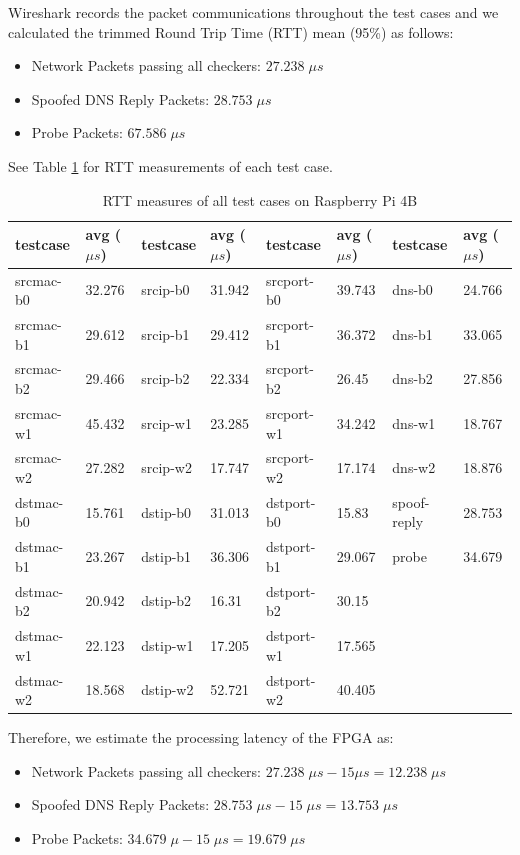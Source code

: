 \documentclass[a4paper]{report}
\begin{document}
Wireshark records the packet communications throughout the test cases and we calculated the trimmed Round Trip Time (RTT) mean (95\%) as follows:
\begin{itemize}[noitemsep]
    \item Network Packets passing all checkers: $27.238\; \mu s$
    \item Spoofed DNS Reply Packets: $28.753\; \mu s$
    \item Probe Packets: $67.586\; \mu s$
\end{itemize}
See Table \ref{table:performance-test} for RTT measurements of each test case.

\begin{table}[h!]
\begin{tabular}{ll|ll|ll|ll}
\hline
testcase  & avg ($\mu s$) & testcase & avg ($\mu s$) & testcase   & avg ($\mu s$) & testcase  & avg ($\mu s$) \\ \hline
srcmac-b0 & 32.276   & srcip-b0 & 31.942   & srcport-b0 & 39.743   & dns-b0      & 24.766   \\
srcmac-b1 & 29.612   & srcip-b1 & 29.412   & srcport-b1 & 36.372   & dns-b1      & 33.065   \\
srcmac-b2 & 29.466   & srcip-b2 & 22.334   & srcport-b2 & 26.45    & dns-b2      & 27.856   \\
srcmac-w1 & 45.432   & srcip-w1 & 23.285   & srcport-w1 & 34.242   & dns-w1      & 18.767   \\
srcmac-w2 & 27.282   & srcip-w2 & 17.747   & srcport-w2 & 17.174   & dns-w2      & 18.876   \\
dstmac-b0 & 15.761   & dstip-b0 & 31.013   & dstport-b0 & 15.83    & spoof-reply & 28.753   \\
dstmac-b1 & 23.267   & dstip-b1 & 36.306   & dstport-b1 & 29.067   & probe       & 34.679   \\
dstmac-b2 & 20.942   & dstip-b2 & 16.31    & dstport-b2 & 30.15    &             &          \\
dstmac-w1 & 22.123   & dstip-w1 & 17.205   & dstport-w1 & 17.565   &             &          \\
dstmac-w2 & 18.568   & dstip-w2 & 52.721   & dstport-w2 & 40.405   &             &          \\ \hline
\end{tabular}
\caption{RTT measures of all test cases on Raspberry Pi 4B}
\label{table:performance-test}
\end{table}
Therefore, we estimate the processing latency of the FPGA as:
\begin{itemize}[noitemsep]
    \item Network Packets passing all checkers: $27.238\; \mu s - 15\mu s = 12.238\; \mu s$
    \item Spoofed DNS Reply Packets: $28.753\; \mu s - 15\; \mu s = 13.753\; \mu s$
    \item Probe Packets: $34.679\; \mu - 15\; \mu s = 19.679\; \mu s$
\end{itemize}
\end{document}

